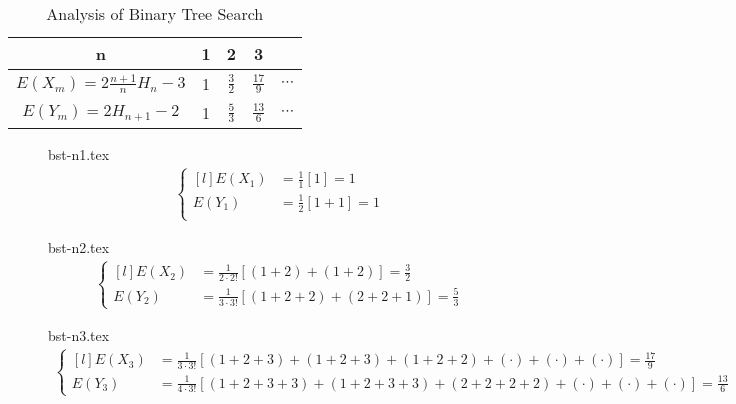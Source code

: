 \documentclass[12pt,a4paper,oneside]{report}
\begin{document}
\begin{table}[]
	\centering
	\caption{Analysis of Binary Tree Search}
	\label{bst}
	\begin{tabular}{|c | c | c | c | c|}
		\hline
		n & 1 & 2 & 3 &
		\\ \hline
		$E(X_m) = 2 \frac{n+1}{n} H_n - 3$ & 1 & $\frac{3}{2}$ & $\frac{17}{9}$ & $\cdots$ 
		\\ \hline
		$E(Y_m) = 2 H_{n+1} - 2$ & 1 & $\frac{5}{3}$ & $\frac{13}{6}$ & $\cdots$ 
		\\ \hline
	\end{tabular}
\end{table}

\begin{description}
	\item[]
		{bst-n1.tex}
		\begin{align*}
			\left\{\begin{matrix*}[l]
				E(X_1) &= \frac{1}{1} \left[1\right] = 1 \\
				E(Y_1) &= \frac{1}{2} \left[1+1\right] = 1 \\
			\end{matrix*}\right.
		\end{align*}
	\item[]
		{bst-n2.tex}
		\begin{align*}
			\left\{\begin{matrix*}[l]
				E(X_2) &= \frac{1}{2 \cdot 2!} \left[(1+2) + (1+2)\right] 
						= \frac{3}{2} \\
				E(Y_2) &= \frac{1}{3 \cdot 3!} \left[(1+2+2) + (2+2+1)\right] 
						= \frac{5}{3}
			\end{matrix*}\right.
		\end{align*}
	\item[]
		{bst-n3.tex}
		\begin{align*}
			\left\{\begin{matrix*}[l]
				E(X_3) &= \frac{1}{3 \cdot 3!} \left[(1+2+3) + (1+2+3) +
							(1+2+2) + (\cdot) + (\cdot) + (\cdot) \right]
						= \frac{17}{9} \\
				E(Y_3) &= \frac{1}{4 \cdot 3!} \left[(1+2+3+3) + (1+2+3+3) +
							(2+2+2+2) + (\cdot) + (\cdot) + (\cdot) \right] 
						= \frac{13}{6}
			\end{matrix*}\right.
		\end{align*}
\end{description}
\end{document}
